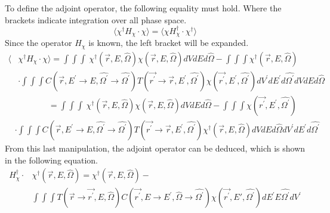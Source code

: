 To define the adjoint operator, the following equality must hold. Where the 
brackets indicate integration over all phase space.
\begin{equation*}
  \langle \chi^{\dagger}H_{\chi} \cdot \chi \rangle = 
  \langle \chi H_{\chi}^{\dagger} \cdot \chi^{\dagger} \rangle
\end{equation*}
Since the operator $H_{\chi}$ is known, the left bracket will be expanded.
\begin{equation*}
  \begin{split}
    \langle &\chi^{\dagger}H_{\chi} \cdot \chi \rangle =
    \int\int\int \
    \chi^{\dagger}(\vec{r},E,\hat{\Omega}) \chi(\vec{r},E,\hat{\Omega})
    dV dE d\hat{\Omega} - \int\int\int \chi^{\dagger}(\vec{r},E,\hat{\Omega}) \\
    & \cdot \int\int\int 
    C(\vec{r},E^{'} \to E, \hat{\Omega^{'}} \to \hat{\Omega^{'}})
    T(\vec{r^{'}} \to \vec{r},E^{'},\hat{\Omega^{'}})
    \chi(\vec{r^{'}},E^{'},\hat{\Omega^{'}}) dV^{'}dE^{'}d\hat{\Omega^{'}}
    dV dE d\hat{\Omega}
  \end{split}
\end{equation*}
\begin{equation*}
  \begin{split}
    & \qquad \qquad = \int\int\int \
    \chi^{\dagger}(\vec{r},E,\hat{\Omega}) \chi(\vec{r},E,\hat{\Omega})
    dV dE d\hat{\Omega} - \int\int\int \chi(\vec{r^{'}},E^{'},\hat{\Omega^{'}}) \\
    & \cdot \int\int\int 
    C(\vec{r},E^{'} \to E, \hat{\Omega^{'}} \to \hat{\Omega^{'}})
    T(\vec{r^{'}} \to \vec{r},E^{'},\hat{\Omega^{'}})
    \chi^{\dagger}(\vec{r},E,\hat{\Omega}) dV dE d\hat{\Omega}
    dV^{'}dE^{'}d\hat{\Omega^{'}}
  \end{split}
\end{equation*}
From this last manipulation, the adjoint operator can be deduced, which is 
shown in the following equation.
\begin{equation}
  \begin{split}
    H_{\chi}^{\dagger} \cdot &\chi^{\dagger}(\vec{r},E,\hat{\Omega}) = 
    \chi^{\dagger}(\vec{r},E,\hat{\Omega}) - \\
    & \int\int\int T(\vec{r} \to \vec{r^{'}},E,\hat{\Omega}) 
    C(\vec{r^{'}},E \to E^{'},\hat{\Omega} \to \hat{\Omega^{'}})
    \chi(\vec{r^{'}},E',\hat{\Omega^{'}}) dE^{'}E\hat{\Omega^{'}}dV^{'}
  \end{split}
\end{equation}


